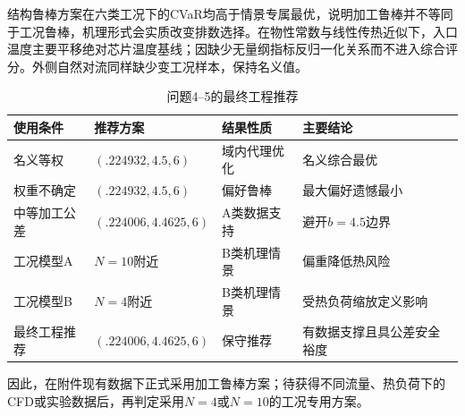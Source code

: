 \documentclass[UTF8,a4paper,10pt]{ctexart}
\begin{document}
结构鲁棒方案在六类工况下的CVaR均高于情景专属最优，说明加工鲁棒并不等同于工况鲁棒，机理形式会实质改变排数选择。在物性常数与线性传热近似下，入口温度主要平移绝对芯片温度基线；因缺少无量纲指标反归一化关系而不进入综合评分。外侧自然对流同样缺少变工况样本，保持名义值。
\begin{table}[H]\centering\scriptsize\caption{问题4--5的最终工程推荐}\begin{tabular}{p{2.3cm}p{3.0cm}p{2.5cm}p{4.2cm}}\toprule 使用条件&推荐方案&结果性质&主要结论\\\midrule
名义等权&$(.224932,4.5,6)$&域内代理优化&名义综合最优\\
权重不确定&$(.224932,4.5,6)$&偏好鲁棒&最大偏好遗憾最小\\
中等加工公差&$(.224006,4.4625,6)$&A类数据支持&避开$b=4.5$边界\\
工况模型A&$N=10$附近&B类机理情景&偏重降低热风险\\
工况模型B&$N=4$附近&B类机理情景&受热负荷缩放定义影响\\
最终工程推荐&$(.224006,4.4625,6)$&保守推荐&有数据支撑且具公差安全裕度\\\bottomrule\end{tabular}\end{table}
因此，在附件现有数据下正式采用加工鲁棒方案；待获得不同流量、热负荷下的CFD或实验数据后，再判定采用$N=4$或$N=10$的工况专用方案。
\end{document}
